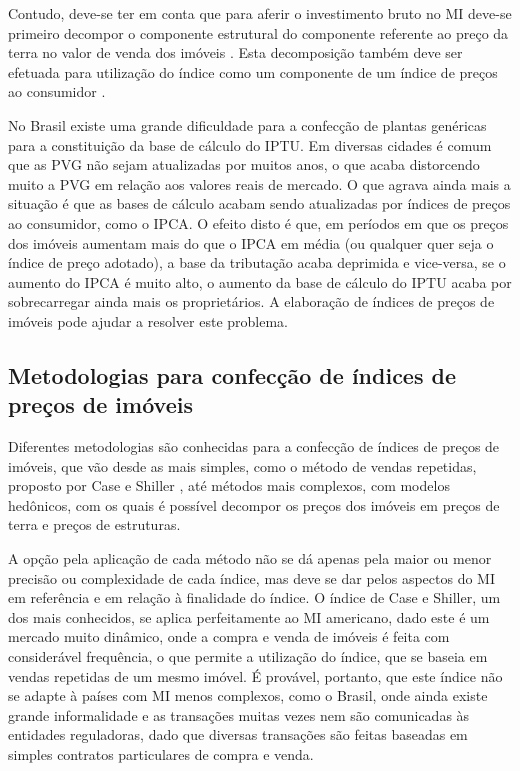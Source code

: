 \documentclass[
	12pt,				%
	oneside,			%
	a4paper,			%
	chapter=TITLE,		%
	section=TITLE,		%
	english,			%
	brazil				%
	]{abntex2}
\begin{document}
Contudo, deve-se ter em conta que para aferir o investimento bruto no \gls{MI}
deve-se primeiro decompor o componente estrutural do componente
referente ao preço da terra no valor de venda dos imóveis \autocite[155]{rppi}. Esta
decomposição também deve ser efetuada para utilização do índice como um
componente de um índice de preços ao consumidor \autocite[156]{rppi}.

No Brasil existe uma grande dificuldade para a confecção de plantas genéricas
para a constituição da base de cálculo do \gls{IPTU}. Em diversas cidades é
comum que as \gls{PVG} não sejam atualizadas por muitos anos, o que acaba
distorcendo muito a \gls{PVG} em relação aos valores reais de mercado. O que
agrava ainda mais a situação é que as bases de cálculo acabam sendo atualizadas
por índices de preços ao consumidor, como o \gls{IPCA}. O efeito disto é que, em
períodos em que os preços dos imóveis aumentam mais do que o \gls{IPCA} em média
(ou qualquer quer seja o índice de preço adotado), a base da tributação acaba
deprimida e vice-versa, se o aumento do \gls{IPCA} é muito alto, o aumento da
base de cálculo do \gls{IPTU} acaba por sobrecarregar ainda mais os
proprietários. A elaboração de índices de preços de imóveis pode ajudar a
resolver este problema.

\hypertarget{metodologias-para-confecuxe7uxe3o-de-uxedndices-de-preuxe7os-de-imuxf3veis}{%
\subsection{Metodologias para confecção de índices de preços de imóveis}\label{metodologias-para-confecuxe7uxe3o-de-uxedndices-de-preuxe7os-de-imuxf3veis}}

Diferentes metodologias são conhecidas para a confecção de índices de preços de
imóveis, que vão desde as mais simples, como o método de vendas repetidas,
proposto por Case e Shiller \autocite*{repeatedSales}, até métodos mais complexos, com
modelos hedônicos, com os quais é possível decompor os preços dos imóveis em
preços de terra e preços de estruturas.

A opção pela aplicação de cada método não se dá apenas pela maior ou menor
precisão ou complexidade de cada índice, mas deve se dar pelos aspectos do
\gls{MI} em referência e em relação à finalidade do índice. O índice de Case e
Shiller, um dos mais conhecidos, se aplica perfeitamente ao \gls{MI} americano,
dado este é um mercado muito dinâmico, onde a compra e venda de imóveis é feita
com considerável frequência, o que permite a utilização do índice, que se baseia
em vendas repetidas de um mesmo imóvel. É provável, portanto, que este índice
não se adapte à países com \gls{MI} menos complexos, como o Brasil, onde ainda
existe grande informalidade e as transações muitas vezes nem são comunicadas às
entidades reguladoras, dado que diversas transações são feitas baseadas em
simples contratos particulares de compra e venda.
\end{document}
